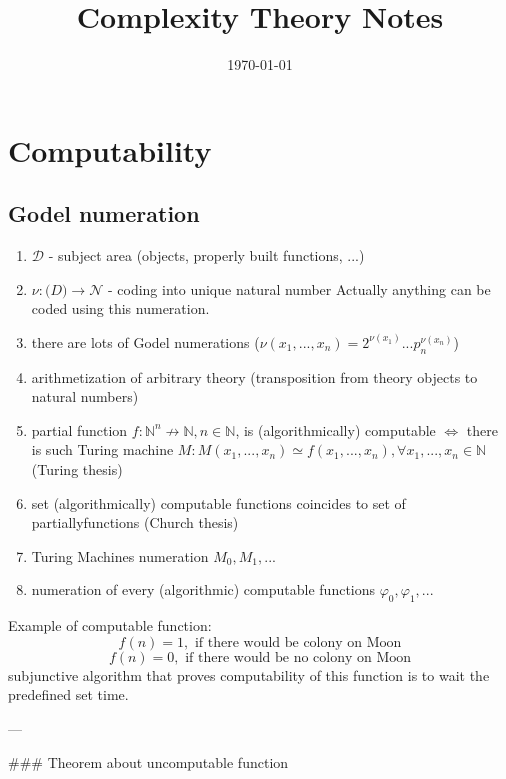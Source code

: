 \documentclass[12pt,letterpaper]{report}
\title{Complexity Theory Notes}
\author{}
\date{\today}
\begin{document}
\maketitle
\tableofcontents
\chapter{Computability}

\section{Godel numeration}

\begin{enumerate}
\item $\mathcal{D}$ - subject area (objects, properly built functions, ...)
\item $\nu : \mathcal(D) \rightarrow \mathcal{N}$ - coding into unique natural number
Actually anything can be coded using this numeration.
\item there are lots of Godel numerations ($\nu(x_1, ..., x_n) = 2^{\nu(x_1)} ... p_n^{\nu(x_n)}$)
\item arithmetization of arbitrary theory (transposition from theory objects to natural numbers)
\item partial function $f : \mathbb{N}^{n} \not\to \mathbb{N}, n \in \mathbb{N}$, is (algorithmically) computable $\iff$ there is such Turing machine $M: M(x_1, ..., x_n) \simeq f(x_1, ..., x_n), \forall x_1, ..., x_n \in \mathbb{N}$ (Turing thesis)
\item set (algorithmically) computable functions coincides to set of partially\itemrecursive functions (Church thesis)
\item Turing Machines numeration $M_0, M_1, ...$
\item numeration of every (algorithmic) computable functions $\varphi_0, \varphi_1, ...$
\end{enumerate}

Example of computable function:
$$f(n) = 1, \text{ if there would be colony on Moon}$$
$$f(n) = 0, \text{ if there would be no colony on Moon}$$
subjunctive algorithm that proves computability of this function is to wait the predefined set time.

---

### Theorem about uncomputable function
\end{document}
